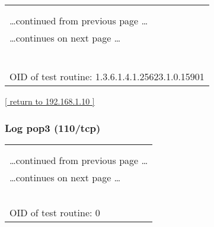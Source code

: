 \documentclass{article}
\begin{document}
\begin{longtable}{|p{}|}
\hline
\rowcolor{openvas_log}{\color{white}{Log (CVSS: 0.0) }}\\
\rowcolor{openvas_log}{\color{white}{NVT: SSL Certificate Expiry}}\\
\hline
\endfirsthead
\hfill\ldots continued from previous page \ldots \\
\hline
\endhead
\hline
\ldots continues on next page \ldots \\
\endfoot
\hline
\endlastfoot
\\
\rowcolor{white}{\verb=The SSL certificate of the remote service is valid between=}\\
\rowcolor{white}{\verb=2014-12-04 15:16:06 GMT and 2015-12-04 15:16:06 GMT.=}\\
\rowcolor{white}{\verb==}\\
\rowcolor{white}{\verb==}\\
\\
OID of test routine: 1.3.6.1.4.1.25623.1.0.15901\\
\end{longtable}

\begin{footnotesize}\hyperref[host:192.168.1.10]{[ return to 192.168.1.10 ]}\end{footnotesize}
\subsubsection{Log pop3 (110/tcp)}
\label{port:192.168.1.10 pop3 (110/tcp) Log}

\begin{longtable}{|p{}|}
\hline
\rowcolor{openvas_log}{\color{white}{Log}}\\
\rowcolor{openvas_log}{\color{white}{NVT: }}\\
\hline
\endfirsthead
\hfill\ldots continued from previous page \ldots \\
\hline
\endhead
\hline
\ldots continues on next page \ldots \\
\endfoot
\hline
\endlastfoot
\\
\rowcolor{white}{\verb=Open port.=}\\
\rowcolor{white}{\verb==}\\
\rowcolor{white}{\verb==}\\
\\
OID of test routine: 0\\
\end{longtable}
\end{document}
